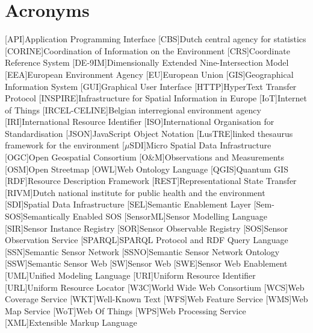 \chapter*{Acronyms}

\begin{acronym}[UML]
  [API]{Application Programming Interface}
  [CBS]{Dutch central agency for statistics}
  [CORINE]{Coordination of Information on the Environment} 
  [CRS]{Coordinate Reference System} 
  [DE-9IM]{Dimensionally Extended Nine-Intersection Model}
  [EEA]{European Environment Agency}
  [EU]{European Union}
  [GIS]{Geographical Information System}
  [GUI]{Graphical User Interface}
  [HTTP]{HyperText Transfer Protocol}
  [INSPIRE]{Infrastructure for Spatial Information in Europe}
  [IoT]{Internet of Things}
  [IRCEL-CELINE]{Belgian interregional environment agency}
  [IRI]{International Resource Identifier}
  [ISO]{International Organisation for Standardisation}
  [JSON]{JavaScript Object Notation}
  [LusTRE]{linked thesaurus framework for the environment} 
  [$\mu$SDI]{Micro Spatial Data Infrastructure}
  [OGC]{Open Geospatial Consortium}
  [O\&M]{Observations and Measurements}
  [OSM]{Open Streetmap}
  [OWL]{Web Ontology Language}
  [QGIS]{Quantum GIS}
  [RDF]{Resource Description Framework}
  [REST]{Representational State Transfer}
  [RIVM]{Dutch national institute for public health and the environment}
  [SDI]{Spatial Data Infrastructure}
  [SEL]{Semantic Enablement Layer}
  [Sem-SOS]{Semantically Enabled SOS}
  [SensorML]{Sensor Modelling Language}
  [SIR]{Sensor Instance Registry}
  [SOR]{Sensor Observable Registry}
  [SOS]{Sensor Observation Service}
  [SPARQL]{SPARQL Protocol and RDF Query Language}
  [SSN]{Semantic Sensor Network}
  [SSNO]{Semantic Sensor Network Ontology}
  [SSW]{Semantic Sensor Web}
  [SW]{Sensor Web}
  [SWE]{Sensor Web Enablement}
  [UML]{Unified Modeling Language}
  [URI]{Uniform Resource Identifier}
  [URL]{Uniform Resource Locator}
  [W3C]{World Wide Web Consortium}
  [WCS]{Web Coverage Service}
  [WKT]{Well-Known Text}
  [WFS]{Web Feature Service}
  [WMS]{Web Map Service}
  [WoT]{Web Of Things}
  [WPS]{Web Processing Service}
  [XML]{Extensible Markup Language}
\end{acronym}